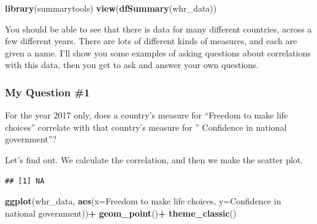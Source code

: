 \documentclass[
]{book}
\newenvironment{Shaded}{\begin{snugshade}}{\end{snugshade}}
\newcommand{\AttributeTok}[1]{\textcolor[rgb]{0.13,0.29,0.53}{#1}}
\newcommand{\FunctionTok}[1]{\textcolor[rgb]{0.13,0.29,0.53}{\textbf{#1}}}
\newcommand{\NormalTok}[1]{#1}
\newcommand{\SpecialCharTok}[1]{\textcolor[rgb]{0.81,0.36,0.00}{\textbf{#1}}}
\newcommand{\StringTok}[1]{\textcolor[rgb]{0.31,0.60,0.02}{#1}}
\begin{document}
\begin{Shaded}
\begin{Highlighting}[]
\FunctionTok{library}\NormalTok{(summarytools)}
\FunctionTok{view}\NormalTok{(}\FunctionTok{dfSummary}\NormalTok{(whr\_data))}
\end{Highlighting}
\end{Shaded}

You should be able to see that there is data for many different countries, across a few different years. There are lots of different kinds of measures, and each are given a name. I'll show you some examples of asking questions about correlations with this data, then you get to ask and answer your own questions.

\hypertarget{my-question-1}{%
\subsubsection{My Question \#1}\label{my-question-1}}

For the year 2017 only, does a country's measure for ``Freedom to make life choices'' correlate with that country's measure for '' Confidence in national government''?

Let's find out. We calculate the correlation, and then we make the scatter plot.

\begin{Shaded}
\end{Shaded}

\begin{verbatim}
## [1] NA
\end{verbatim}

\begin{Shaded}
\begin{Highlighting}[]
\FunctionTok{ggplot}\NormalTok{(whr\_data, }\FunctionTok{aes}\NormalTok{(}\AttributeTok{x=}\StringTok{\textasciigrave{}}\AttributeTok{Freedom to make life choices}\StringTok{\textasciigrave{}}\NormalTok{,}
                     \AttributeTok{y=}\StringTok{\textasciigrave{}}\AttributeTok{Confidence in national government}\StringTok{\textasciigrave{}}\NormalTok{))}\SpecialCharTok{+}
  \FunctionTok{geom\_point}\NormalTok{()}\SpecialCharTok{+}
  \FunctionTok{theme\_classic}\NormalTok{()}
\end{Highlighting}
\end{Shaded}
\end{document}
